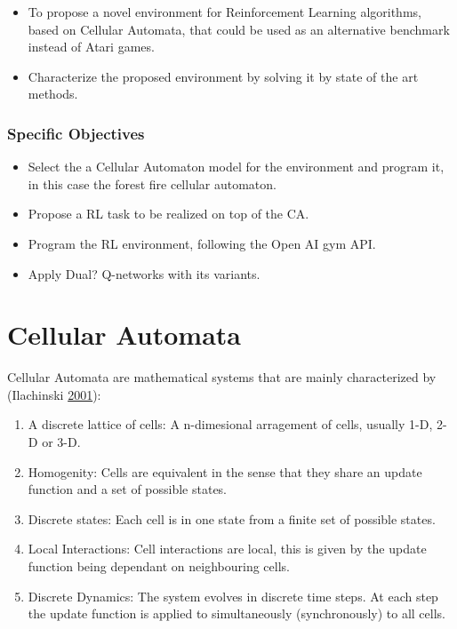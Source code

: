 \documentclass[
]{book}
\providecommand{\tightlist}{%
  \setlength{\itemsep}{0pt}\setlength{\parskip}{0pt}}
\begin{document}
\begin{itemize}
\tightlist
\item
  To propose a novel environment for Reinforcement Learning algorithms, based on Cellular Automata, that could be used as an alternative benchmark instead of Atari games.
\item
  Characterize the proposed environment by solving it by state of the art methods.
\end{itemize}

\hypertarget{specific-objectives}{%
\subsection{Specific Objectives}\label{specific-objectives}}

\begin{itemize}
\tightlist
\item
  Select the a Cellular Automaton model for the environment and program it, in this case the forest fire cellular automaton.
\item
  Propose a RL task to be realized on top of the CA.
\item
  Program the RL environment, following the Open AI gym API.
\item
  Apply Dual? Q-networks with its variants.
\end{itemize}

\hypertarget{cellular-automata}{%
\chapter{Cellular Automata}\label{cellular-automata}}

Cellular Automata are mathematical systems that are mainly characterized by (Ilachinski \protect\hyperlink{ref-ilachinski2001cellular}{2001}):

\begin{enumerate}
\def\labelenumi{\arabic{enumi}.}
\item
  A discrete lattice of cells:
  A n-dimesional arragement of cells, usually 1-D, 2-D or 3-D.
\item
  Homogenity:
  Cells are equivalent in the sense that they share an update function and a set of possible states.
\item
  Discrete states:
  Each cell is in one state from a finite set of possible states.
\item
  Local Interactions:
  Cell interactions are local, this is given by the update function being dependant on neighbouring cells.
\item
  Discrete Dynamics:
  The system evolves in discrete time steps. At each step the update function is applied to simultaneously (synchronously) to all cells.
\end{enumerate}
\end{document}
